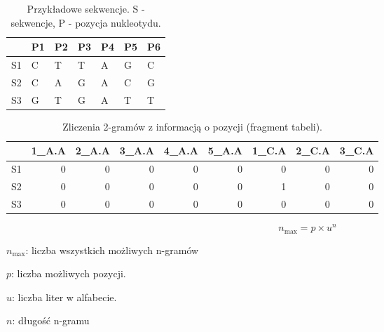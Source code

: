 \documentclass[10pt]{beamer}\usepackage[]{graphicx}\usepackage[]{color}
\begin{document}
\begin{frame}

\begin{table}[ht]
\centering
\begin{tabular}{rllllll}
  \hline
 & P1 & P2 & P3 & P4 & P5 & P6 \\ 
  \hline
S1 & C & T & T & A & G & C \\ 
  S2 & C & A & G & A & C & G \\ 
  S3 & G & T & G & A & T & T \\ 
   \hline
\end{tabular}
\caption{Przykładowe sekwencje.  S - sekwencje, P - pozycja nukleotydu.} 
\end{table}

  

  
\begin{table}[ht]
\centering
\begin{tabular}{rrrrrrrrr}
  \hline
 & 1\_A.A & 2\_A.A & 3\_A.A & 4\_A.A & 5\_A.A & 1\_C.A & 2\_C.A & 3\_C.A \\ 
  \hline
S1 & 0 & 0 & 0 & 0 & 0 & 0 & 0 & 0 \\ 
  S2 & 0 & 0 & 0 & 0 & 0 & 1 & 0 & 0 \\ 
  S3 & 0 & 0 & 0 & 0 & 0 & 0 & 0 & 0 \\ 
   \hline
\end{tabular}
\caption{Zliczenia 2-gramów z informacją o pozycji (fragment tabeli).} 
\end{table}


\end{frame}

\begin{frame}
$$n_\text{max} = p \times u^n$$

$n_\text{max}$: liczba wszystkich możliwych n-gramów

$p$: liczba możliwych pozycji.

$u$: liczba liter w alfabecie.

$n$: długość n-gramu

\end{frame}
\end{document}
